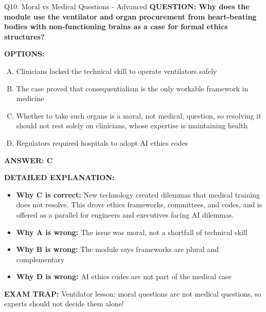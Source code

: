 \documentclass[8pt]{beamer}
\begin{document}
\begin{frame}[shrink=6]{Q10: Moral vs Medical Questions - Advanced}
\fontsize{6.5}{7.5}\selectfont
\textbf{QUESTION: Why does the module use the ventilator and organ procurement from heart-beating bodies with non-functioning brains as a case for formal ethics structures?}

\vspace{0.1cm}
\textbf{OPTIONS:}
\begin{enumerate}[A.]
\item Clinicians lacked the technical skill to operate ventilators safely
\item The case proved that consequentialism is the only workable framework in medicine
\item Whether to take such organs is a moral, not medical, question, so resolving it should not rest solely on clinicians, whose expertise is maintaining health
\item Regulators required hospitals to adopt AI ethics codes
\end{enumerate}

\vspace{0.1cm}
\textcolor{myblue}{\textbf{ANSWER: C}}

\vspace{0.1cm}
\textbf{DETAILED EXPLANATION:}
\begin{itemize}
\item \textbf{Why C is correct:} New technology created dilemmas that medical training does not resolve. This drove ethics frameworks, committees, and codes, and is offered as a parallel for engineers and executives facing AI dilemmas.
\item \textbf{Why A is wrong:} The issue was moral, not a shortfall of technical skill
\item \textbf{Why B is wrong:} The module says frameworks are plural and complementary
\item \textbf{Why D is wrong:} AI ethics codes are not part of the medical case
\end{itemize}

\textcolor{myred}{\textbf{EXAM TRAP:}} Ventilator lesson: moral questions are not medical questions, so experts should not decide them alone!
\end{frame}

\end{document}
